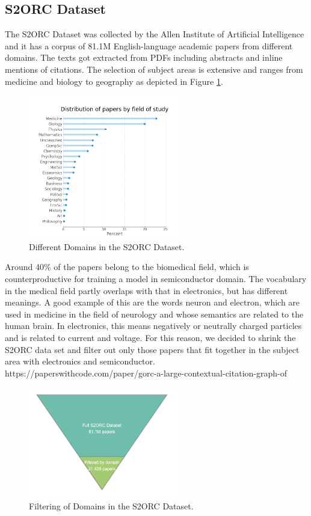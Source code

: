 \subsection{S2ORC Dataset} \label{s2orc_dataset}
The S2ORC Dataset was collected by the Allen Institute of Artificial  Intelligence  and  it  has  a  corpus  of 81.1M  English-language academic papers from different domains. The texts  got  extracted  from  PDFs  including  abstracts  and  inline mentions of citations. The selection of subject areas is extensive and ranges from medicine and biology to geography as depicted in Figure \ref{fig:domains}.

\begin{figure}[H]
	\centering
	\includegraphics[width=0.6\textwidth]{figures/S2ORC_Domains.PNG}
	\caption{Different Domains in the S2ORC Dataset.}
	\label{fig:domains}
\end{figure}

Around 40\% of the papers belong to the  biomedical field, which is counterproductive for training a model in semiconductor domain. The vocabulary in the medical field partly overlaps with that in electronics, but has different meanings. A good example of this are the words neuron and electron, which are used in medicine in the field of neurology and whose semantics are related to the human brain. In electronics, this means negatively or neutrally charged particles and is related to current and voltage. For this reason, we decided to shrink the S2ORC data set and filter out only those papers that fit together in the subject area with electronics and semiconductor.
\alert{https://paperswithcode.com/paper/gorc-a-large-contextual-citation-graph-of}

\begin{figure}[H]
	\centering
	\includegraphics[width=0.6\textwidth]{figures/s2orc_filtered.PNG}
	\caption{Filtering of Domains in the S2ORC Dataset.}
	\label{fig:filtered_domains}
\end{figure}

